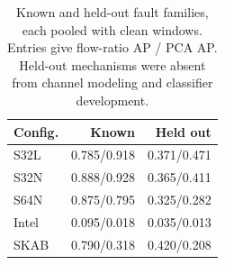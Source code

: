 \begin{table}[t]
\centering
\caption{Known and held-out fault families, each pooled with clean windows. Entries give flow-ratio AP / PCA AP. Held-out mechanisms were absent from channel modeling and classifier development.}
\label{tab:strata}
\small
\begin{tabular}{lrr}
\toprule
Config. & Known & Held out \\
\midrule
S32L & 0.785/0.918 & 0.371/0.471 \\
S32N & 0.888/0.928 & 0.365/0.411 \\
S64N & 0.875/0.795 & 0.325/0.282 \\
Intel & 0.095/0.018 & 0.035/0.013 \\
SKAB & 0.790/0.318 & 0.420/0.208 \\
\bottomrule
\end{tabular}
\end{table}
